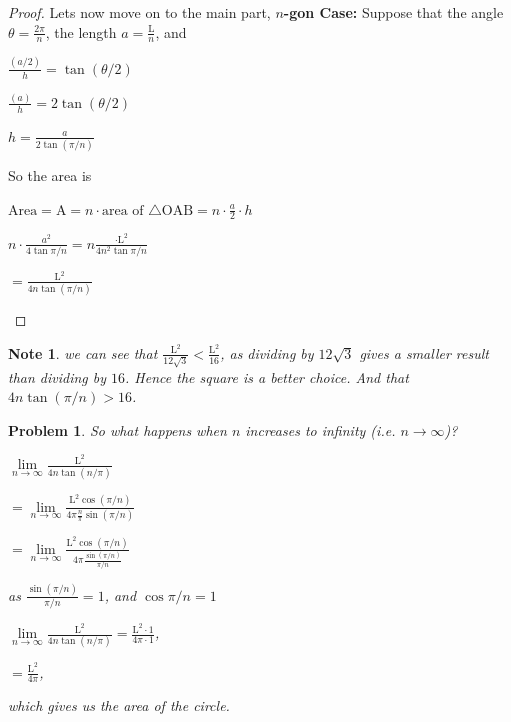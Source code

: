 \documentclass[a4paper]{book}
\newtheorem{note}[theorem]{Note}%
\newtheorem{problem}[theorem]{Problem}%
\numberwithin{theorem}{section}%
\begin{document}
\begin{proof}
    Lets now move on to the main part, \textbf{$n$-gon Case:} Suppose that the angle $\displaystyle \theta=\frac{2\pi}{n}$, the length $a=\frac{\mathrm{L}}{n}$, and 
    \begin{center}
        $\displaystyle \frac{(a/2)}{h}=\tan{(\theta/2)}$

        $\displaystyle \frac{(a)}{h}=2\tan{(\theta/2)}$

        $\displaystyle h=\frac{a}{2\tan{(\pi/n)}}$
    \end{center}
    So the area is
    \begin{center}
        $\displaystyle \mathrm{Area}=\mathrm{A}=n\cdot\text{area of }\triangle\mathrm{OAB}=n\cdot\frac{a}{2}\cdot h$

        $\displaystyle n\cdot\frac{a^{2}}{4\tan{\pi/n}}=n\frac{\cdot\mathrm{L}^{2}}{4n^{2}\tan{\pi/n}}$

        $\displaystyle =\frac{\mathrm{L^{2}}}{4n\tan{(\pi/n)}}$
    \end{center}
\end{proof}

\begin{note}
    we can see that $\displaystyle \frac{\mathrm{L}^{2}}{12\sqrt{3}}<\frac{\mathrm{L}^{2}}{16}$, as dividing by $12\sqrt{3}$ gives a smaller result than dividing by $16$. Hence the square is a better choice. And that $\displaystyle 4n\tan{(\pi/n)>{16}}$.
\end{note}
\begin{problem}
    So what happens when $n$ increases to infinity (i.e. $n\to\infty$)?

    \begin{center}
        $\displaystyle \underset{n\to\infty}{\lim}\frac{\mathrm{L}^{2}}{4n\tan{(n/\pi)}}$

        $\displaystyle =\underset{n\to\infty}{\lim}\frac{\mathrm{L}^{2}\cos{(\pi/n)}}{4\pi\frac{n}{\pi}\sin{(\pi/n)}}$

        $\displaystyle =\underset{n\to\infty}{\lim}\frac{\mathrm{L}^{2}\cos{(\pi/n)}}{4\pi\frac{\sin{(\pi/n)}}{\pi/n}}$
    \end{center}
    as $\displaystyle \frac{\sin{(\pi/n)}}{\pi/n}=1$, and $\cos{\pi/n}=1$
    \begin{center}
        $\displaystyle \underset{n\to\infty}{\lim}\frac{\mathrm{L}^{2}}{4n\tan{(n/\pi)}}=\frac{\mathrm{L}^{2}\cdot1}{4\pi\cdot1}$,

        $\displaystyle =\frac{\mathrm{L}^{2}}{4\pi}$,
    \end{center}
    which gives us the area of the circle.
\end{problem}
\end{document}
